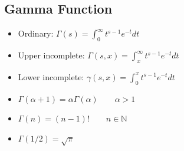 \documentclass[landscape]{article}
\begin{document}
\begin{multicols*}{2}
%
%
%
%
%
%
%
%

\subsection{Gamma Function}
\label{sec:math:gamma}

\begin{itemize}
  \item Ordinary: $\Gamma(s) = \int_0^\infty t^{s-1} e^{-t}dt$
  \item Upper incomplete: $\Gamma(s,x) = \int_x^\infty t^{s-1} e^{-t}dt$
  \item Lower incomplete: $\gamma(s,x) = \int_0^x t^{s-1} e^{-t}dt$
  \item $\Gamma(\alpha + 1) = \alpha \Gamma(\alpha) \qquad \alpha>1$
  \item $\Gamma(n) = (n-1)! \qquad n \in \mathbb N$
  \item $\Gamma(1/2) = \sqrt{\pi}$
\end{itemize}


\end{multicols*}
\end{document}
